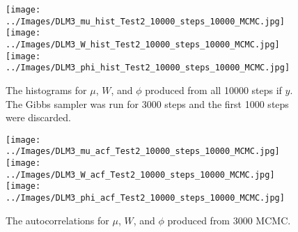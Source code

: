 \documentclass{article}
\begin{document}
\begin{figure}[!h]
\begin{center}
\texttt{[image: ../Images/DLM3\_mu\_hist\_Test2\_10000\_steps\_10000\_MCMC.jpg]}
\texttt{[image: ../Images/DLM3\_W\_hist\_Test2\_10000\_steps\_10000\_MCMC.jpg]}
\texttt{[image: ../Images/DLM3\_phi\_hist\_Test2\_10000\_steps\_10000\_MCMC.jpg]}
\end{center}
\label{DLM4:histograms}
\caption{The histograms for $\mu$, $W$, and $\phi$ produced from all 10000 steps if $y$.  The Gibbs sampler was run for 3000 steps and the first 1000 steps were discarded.}
\end{figure}

\begin{figure}[!h]
\begin{center}
\texttt{[image: ../Images/DLM3\_mu\_acf\_Test2\_10000\_steps\_10000\_MCMC.jpg]}
\texttt{[image: ../Images/DLM3\_W\_acf\_Test2\_10000\_steps\_10000\_MCMC.jpg]}
\texttt{[image: ../Images/DLM3\_phi\_acf\_Test2\_10000\_steps\_10000\_MCMC.jpg]}
\end{center}
\label{DLM4:histograms}
\caption{The autocorrelations for $\mu$, $W$, and $\phi$ produced from  3000 MCMC.}
\end{figure}
\end{document}
